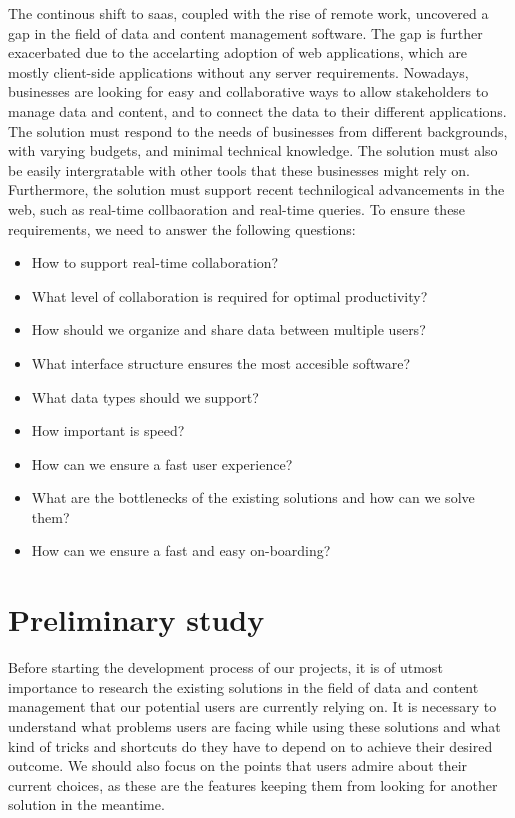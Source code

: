 The continous shift to \acrfull{saas}, coupled with the rise of remote work, uncovered a gap in the field of data and content management software. The gap is further exacerbated due to the accelarting adoption of web applications, which are mostly client-side applications without any server requirements. Nowadays, businesses are looking for easy and collaborative ways to allow stakeholders to manage data and content, and to connect the data to their different applications. The solution must respond to the needs of businesses from different backgrounds, with varying budgets, and minimal technical knowledge. The solution must also be easily intergratable with other tools that these businesses might rely on. Furthermore, the solution must support recent technilogical advancements in the web, such as real-time collbaoration and real-time queries. To ensure these requirements, we need to answer the following questions:

\begin{itemize}
	\item How to support real-time collaboration?
	\item What level of collaboration is required for optimal productivity?
	\item How should we organize and share data between multiple users?
	\item What interface structure ensures the most accesible software?
	\item What data types should we support?
	\item How important is speed?
	\item How can we ensure a fast user experience?
	\item What are the bottlenecks of the existing solutions and how can we solve them?
	\item How can we ensure a fast and easy on-boarding?
\end{itemize}

\section{Preliminary study}

Before starting the development process of our projects, it is of utmost importance to research the existing solutions in the field of data and content management that our potential users are currently relying on.
It is necessary to understand what problems users are facing while using these solutions and what kind of tricks and shortcuts do they have to depend on to achieve their desired outcome. We should also focus on the points that users admire about their current choices, as these are the features keeping them from looking for another solution in the meantime.

